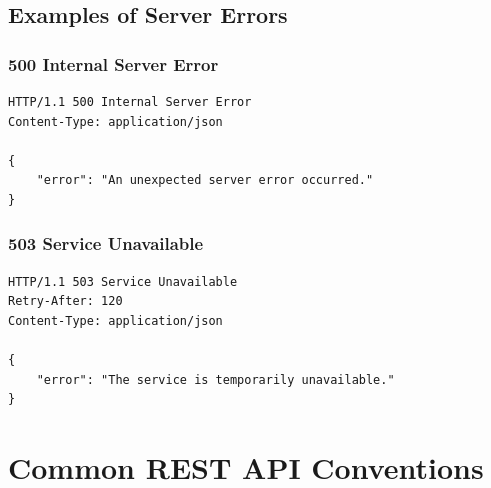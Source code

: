 \documentclass[a4paper]{article}
\begin{document}
        \subsection{Examples of Server Errors}
            
            \subsubsection{500 Internal Server Error}
            
            \begin{verbatim}
HTTP/1.1 500 Internal Server Error
Content-Type: application/json

{
    "error": "An unexpected server error occurred."
}
                \end{verbatim}
            
            \subsubsection{503 Service Unavailable}
            
            \begin{verbatim}
HTTP/1.1 503 Service Unavailable
Retry-After: 120
Content-Type: application/json

{
    "error": "The service is temporarily unavailable."
}
                \end{verbatim}
    
    
    \section{Common REST API Conventions}
        
\end{document}

